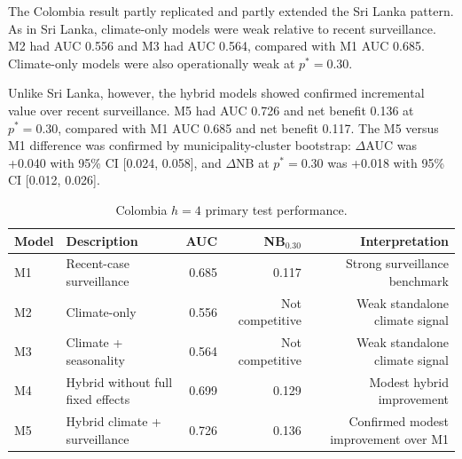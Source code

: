 \documentclass[11pt,a4paper]{article}
\begin{document}
The Colombia result partly replicated and partly extended the Sri Lanka pattern. As in Sri Lanka, climate-only models were weak relative to recent surveillance. M2 had AUC 0.556 and M3 had AUC 0.564, compared with M1 AUC 0.685. Climate-only models were also operationally weak at $p^*=0.30$.

Unlike Sri Lanka, however, the hybrid models showed confirmed incremental value over recent surveillance. M5 had AUC 0.726 and net benefit 0.136 at $p^*=0.30$, compared with M1 AUC 0.685 and net benefit 0.117. The M5 versus M1 difference was confirmed by municipality-cluster bootstrap: $\Delta$AUC was +0.040 with 95\% CI [0.024, 0.058], and $\Delta$NB at $p^*=0.30$ was +0.018 with 95\% CI [0.012, 0.026].

\begin{table}[htbp]
\centering
\caption{Colombia $h=4$ primary test performance.}
\label{tab:colombia-primary-performance}
\small
\begin{tabular}{llrrr}
\toprule
Model & Description & AUC & NB$_{0.30}$ & Interpretation \\
\midrule
M1 & Recent-case surveillance & 0.685 & 0.117 & Strong surveillance benchmark \\
M2 & Climate-only & 0.556 & Not competitive & Weak standalone climate signal \\
M3 & Climate + seasonality & 0.564 & Not competitive & Weak standalone climate signal \\
M4 & Hybrid without full fixed effects & 0.699 & 0.129 & Modest hybrid improvement \\
M5 & Hybrid climate + surveillance & 0.726 & 0.136 & Confirmed modest improvement over M1 \\
\bottomrule
\end{tabular}
\end{table}
\end{document}

